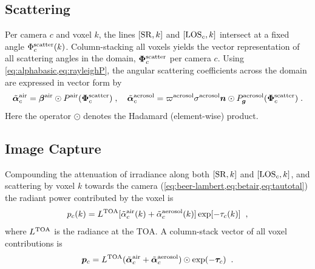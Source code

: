 \documentclass[10pt,letterpaper]{article}
\newcommand{\vect}[1]{\bm{#1}}
\begin{document}

\subsection{Scattering}
\label{sec:scattering}

Per camera $c$ and voxel $k$, the lines $[{\rm SR},k]$ and $[{\rm
  LOS}_c,k]$ intersect at a fixed angle $\Phi^{\rm scatter}_c(k)$.
Column-stacking all voxels yields the vector representation of all
scattering angles in the domain, $\vect{\Phi}^{\rm scatter}_c$ per
camera $c$.
Using \cref{eq:alphabasic,eq:rayleighP}, the angular scattering
coefficients across the domain are expressed in vector form by
\begin{equation}
  \tilde{\vect{\alpha}}^{\rm air}_c =
      \vect{\beta}^{\rm air} \odot P^{\rm air}(\vect{\Phi}^{\rm scatter}_c)\;,
      \quad
  \tilde{\vect{\alpha}}^{\rm aerosol}_c =
       \varpi^{\rm aerosol} \sigma^{\rm aerosol}
        {\bm n} \odot P^{\rm aerosol}_{\bm g}(\vect{\Phi}^{\rm scatter}_c) \;.
  \label{eq:alpha_matrix}
\end{equation}
Here the operator $\odot$ denotes the Hadamard (element-wise)
product.


\subsection{Image Capture}
\label{sec:captured-image}

Compounding the attenuation of irradiance along both $[{\rm SR},k]$
and $[{\rm LOS}_c,k]$, and scattering by voxel $k$ towards the camera
(\cref{eq:beer-lambert,eq:betair,eq:tautotal}) the radiant power
contributed by the voxel is
\begin{equation}
  p_c(k)= L^{\rm TOA}
  [\tilde{\alpha}^{\rm air}_c(k) + \tilde{\alpha}^{\rm aerosol}_c(k)]
  \exp[-\tau_c(k)]
  \;\;,
  \label{eq:ick}
\end{equation}
where $L^{\rm TOA}$ is the radiance at the TOA. A column-stack vector
of all voxel contributions is
\begin{equation}
  {\bm p}_c= L^{\rm TOA}
  (\tilde{\vect{\alpha}}^{\rm air}_c + \tilde{\vect{\alpha}}^{\rm aerosol}_c)
  \odot \exp(-\vect{\tau}_c)
  \;\;.
  \label{eq:pc}
\end{equation}
\end{document}
